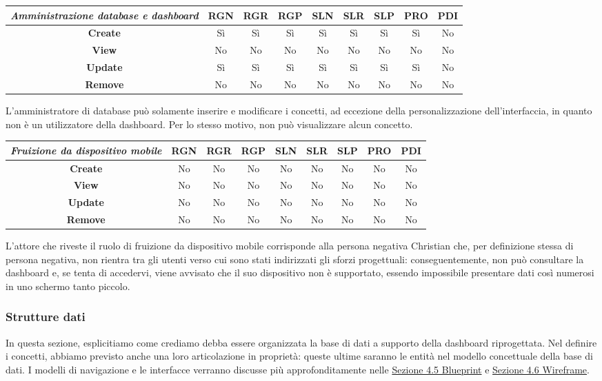 {
\renewcommand{\arraystretch}{2}
\begin{longtable}[h]{| c | c | c | c | c | c | c | c | c |}
    \hline
    \textit{Amministrazione database e dashboard} & \textbf{RGN} & \textbf{RGR} & \textbf{RGP} & \textbf{SLN} & \textbf{SLR} & \textbf{SLP} & \textbf{PRO} & \textbf{PDI} \\
    \hline
    \endhead
    \textbf{Create} & Sì & Sì & Sì & Sì & Sì & Sì & Sì & No \\
    \hline
    \textbf{View}   & No & No & No & No & No & No & No & No \\
    \hline
    \textbf{Update} & Sì & Sì & Sì & Sì & Sì & Sì & Sì & No \\
    \hline
    \textbf{Remove} & No & No & No & No & No & No & No & No \\
    \hline
\end{longtable}
}
\noindent
L'amministratore di database può solamente inserire e modificare i concetti, ad eccezione della personalizzazione dell'interfaccia, in quanto non è un utilizzatore della dashboard.
Per lo stesso motivo, non può visualizzare alcun concetto.

{
\renewcommand{\arraystretch}{2}
\begin{longtable}[h]{| c | c | c | c | c | c | c | c | c |}
    \hline
    \textit{Fruizione da dispositivo mobile} & \textbf{RGN} & \textbf{RGR} & \textbf{RGP} & \textbf{SLN} & \textbf{SLR} & \textbf{SLP} & \textbf{PRO} & \textbf{PDI} \\
    \hline
    \endhead
    \textbf{Create} & No & No & No & No & No & No & No & No \\
    \hline
    \textbf{View}   & No & No & No & No & No & No & No & No \\
    \hline
    \textbf{Update} & No & No & No & No & No & No & No & No \\
    \hline
    \textbf{Remove} & No & No & No & No & No & No & No & No \\
    \hline
\end{longtable}
}
\noindent
L'attore che riveste il ruolo di fruizione da dispositivo mobile corrisponde alla persona negativa Christian che, per definizione stessa di persona negativa, non rientra tra gli utenti verso cui sono stati indirizzati gli sforzi progettuali: conseguentemente, non può consultare la dashboard e, se tenta di accedervi, viene avvisato che il suo dispositivo non è supportato, essendo impossibile presentare dati così numerosi in uno schermo tanto piccolo.

\subsubsection{Strutture dati}
\label{sss:strutture-dati}
In questa sezione, esplicitiamo come crediamo debba essere organizzata la base di dati a supporto della dashboard riprogettata. Nel definire i concetti, abbiamo previsto anche una loro articolazione in proprietà: queste ultime saranno le entità nel modello concettuale della base di dati.
I modelli di navigazione e le interfacce verranno discusse più approfonditamente nelle \hyperref[s:struttura-blueprint]{Sezione 4.5 Blueprint} e \hyperref[s:wireframe]{Sezione 4.6 Wireframe}.